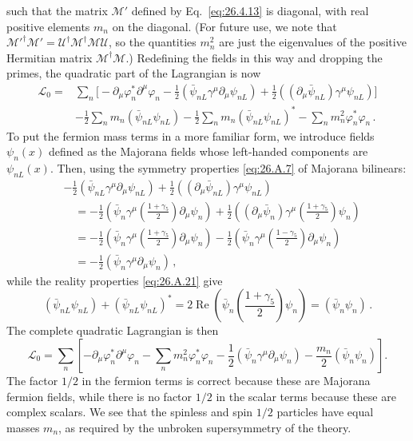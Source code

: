 such that the matrix \(\mathcal{M}'\) defined by Eq.~\eqref{eq:26.4.13} is
diagonal, with real positive elements \(m_n\) on the diagonal. (For future
use, we note that
\(\mathcal{M}'^\dagger\mathcal{M}'=
\mathcal{U}^\dagger\mathcal{M}^\dagger\mathcal{M}\mathcal{U}\), so the
quantities \(m_n^2\) are just the eigenvalues of the positive Hermitian matrix
\(\mathcal{M}^\dagger\mathcal{M}\).) Redefining the fields in this way and
dropping the primes, the quadratic part of the Lagrangian is now
\begin{equation}
  \begin{aligned}
  \mathcal{L}_0={}&
  \sum_n\biggl[
    -\partial_\mu\varphi_n^*\partial^\mu\varphi_n
    -\frac12(\bar\psi_{nL}\gamma^\mu\partial_\mu\psi_{nL})
    +\frac12((\partial_\mu\bar\psi_{nL})\gamma^\mu\psi_{nL})
  \biggr]
  \\
  &-\frac12\sum_n m_n(\bar\psi_{nL}\psi_{nL})
  -\frac12\sum_n m_n(\bar\psi_{nL}\psi_{nL})^*
  -\sum_n m_n^2\varphi_n^*\varphi_n\,.
  \end{aligned}
  \tag{26.4.14}\label{eq:26.4.14}
\end{equation}
To put the fermion mass terms in a more familiar form, we introduce fields
\(\psi_n(x)\) defined as the Majorana fields whose left-handed components are
\(\psi_{nL}(x)\). Then, using the symmetry properties \eqref{eq:26.A.7} of
Majorana bilinears:
\[
  \begin{aligned}
  &-\frac12(\bar\psi_{nL}\gamma^\mu\partial_\mu\psi_{nL})
  +\frac12((\partial_\mu\bar\psi_{nL})\gamma^\mu\psi_{nL})
  \\
  &\quad=
  -\frac12\left(\bar\psi_n\gamma^\mu
    \left(\frac{1+\gamma_5}{2}\right)\partial_\mu\psi_n\right)
  +\frac12\left((\partial_\mu\bar\psi_n)\gamma^\mu
    \left(\frac{1+\gamma_5}{2}\right)\psi_n\right)
  \\
  &\quad=
  -\frac12\left(\bar\psi_n\gamma^\mu
    \left(\frac{1+\gamma_5}{2}\right)\partial_\mu\psi_n\right)
  -\frac12\left(\bar\psi_n\gamma^\mu
    \left(\frac{1-\gamma_5}{2}\right)\partial_\mu\psi_n\right)
  \\
  &\quad=-\frac12(\bar\psi_n\gamma^\mu\partial_\mu\psi_n)\,,
  \end{aligned}
\]
while the reality properties \eqref{eq:26.A.21} give
\[
  (\bar\psi_{nL}\psi_{nL})
  +(\bar\psi_{nL}\psi_{nL})^*
  =2\operatorname{Re}\left(
    \bar\psi_n\left(\frac{1+\gamma_5}{2}\right)\psi_n
  \right)
  =(\bar\psi_n\psi_n)\,.
\]
The complete quadratic Lagrangian is then
\begin{equation}
  \mathcal{L}_0
  =\sum_n\left[
    -\partial_\mu\varphi_n^*\partial^\mu\varphi_n
    -\sum_n m_n^2\varphi_n^*\varphi_n
    -\frac12(\bar\psi_n\gamma^\mu\partial_\mu\psi_n)
    -\frac{m_n}{2}(\bar\psi_n\psi_n)
  \right].
  \tag{26.4.15}\label{eq:26.4.15}
\end{equation}
The factor \(1/2\) in the fermion terms is correct because these are Majorana
fermion fields, while there is no factor \(1/2\) in the scalar terms because
these are complex scalars. We see that the spinless and spin \(1/2\) particles
have equal masses \(m_n\), as required by the unbroken supersymmetry of the
theory.

